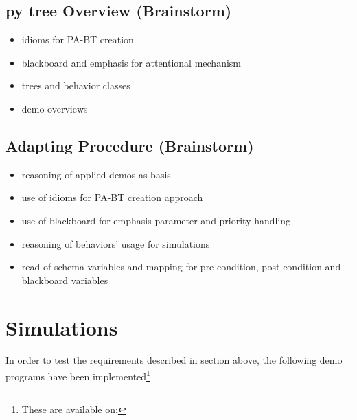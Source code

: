 \documentclass[conference]{IEEEtran}
\begin{document}
\subsection{py tree Overview (Brainstorm)}
\begin{itemize}
\item idioms for PA-BT creation
\item blackboard and emphasis for attentional mechanism
\item trees and behavior classes
\item demo overviews

\end{itemize}
\subsection{Adapting Procedure (Brainstorm)}
\begin{itemize}
\item reasoning of applied demos as basis
\item use of idioms for PA-BT creation approach 
\item use of blackboard for emphasis parameter and priority handling
\item reasoning of behaviors' usage for simulations
\item read of schema variables and mapping for pre-condition, post-condition and blackboard variables

\end{itemize}


\section{Simulations}
In order to test the requirements described in section above, the following demo programs have been implemented\footnote{These are available on:}
\end{document}
